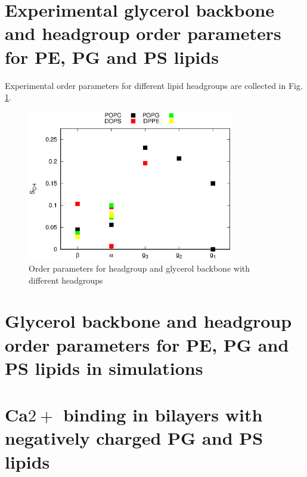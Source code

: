 \documentclass[aps,prl,superscriptaddress,twocolumn]{revtex4}
\begin{document}

\section{Experimental glycerol backbone and headgroup order parameters for PE, PG and PS lipids}

Experimental order parameters for different lipid headgroups are
collected in Fig. \ref{HGorderParameters}.
\begin{figure}[]
  \centering
  \includegraphics[width=9.0cm]{../Figs/HGorderparameters.eps}
  \caption{\label{HGorderParameters}
    Order parameters for headgroup and glycerol backbone with different headgroups
  }
\end{figure}

\section{Glycerol backbone and headgroup order parameters for PE, PG and PS lipids in simulations}


\section{Ca$2+$ binding in bilayers with negatively charged PG and PS lipids}
\end{document}
